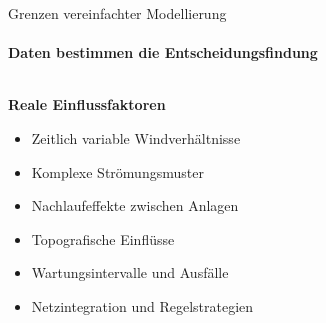 \documentclass[aspectratio=169,11pt]{beamer}
\newcommand{\thgadarkgray}[1]{\textcolor{thgadarkgray}{#1}}
\begin{document}
\begin{frame}{Grenzen vereinfachter Modellierung}
	\framesubtitle{Daten bestimmen die Entscheidungsfindung}
    \begin{columns}[T]
    	\begin{column}{0.45\textwidth}
    	\vspace*{0.75cm}
   			\textbf{Reale Einflussfaktoren}
            \begin{itemize}
                \item Zeitlich variable Windverhältnisse
                \item Komplexe Strömungsmuster
                \item Nachlaufeffekte zwischen Anlagen
                \item Topografische Einflüsse
                \item Wartungsintervalle und Ausfälle
                \item Netzintegration und Regelstrategien
            \end{itemize}
		\end{column}
    		
    	\begin{column}{0.55\textwidth}
    		\begin{center}
    	\end{center}
		\end{column}
    \end{columns}
    

\end{frame}
\end{document}
